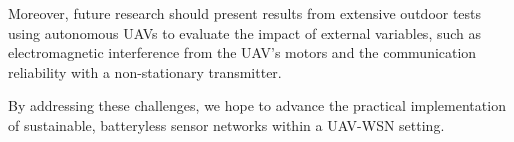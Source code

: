 \documentclass[conference]{IEEEtran}
\begin{document}
Moreover, future research should present results from extensive outdoor tests using autonomous UAVs to evaluate the impact of external variables, such as electromagnetic interference from the UAV's motors and the communication reliability with a non-stationary transmitter.

By addressing these challenges, we hope to advance the practical implementation of sustainable, batteryless sensor networks within a UAV-WSN setting.

% 
% 
\end{document}
